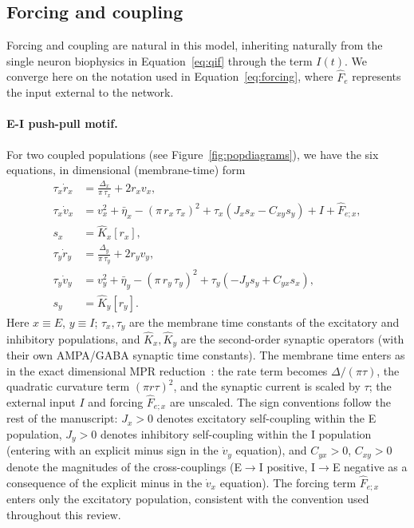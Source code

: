 \documentclass[11pt]{article}
\numberwithin{equation}{section}
\newcommand{\rev}[1]{\begingroup\color{black}#1\endgroup}
\begin{document}
\subsection{Forcing and coupling}
Forcing and coupling are natural in this model, inheriting naturally from the single neuron biophysics in Equation~\ref{eq:qif} through the term $I(t)$. We converge here on the notation used in Equation~\ref{eq:forcing}, where $\hat F_e$ represents the input external to the network.

\paragraph{E-I push-pull motif.}  For two coupled populations (see Figure~\ref{fig:popdiagrams}), we have the six equations, in dimensional (membrane-time) form
\rev{\begin{equation}
\begin{aligned}
\tau_x \dot r_x &= \frac{\Delta_x}{\pi\,\tau_x} + 2 r_x v_x, \\
\tau_x \dot v_x &= v_x^2 + \bar\eta_x - \left(\pi\, r_x\, \tau_x\right)^2
                   + \tau_x\!\left(J_x s_x - C_{xy} s_y\right) + I + \hat F_{e;x}, \\
s_x &= \hat K_x[r_x], \\
\tau_y \dot r_y &= \frac{\Delta_y}{\pi\,\tau_y} + 2 r_y v_y, \\
\tau_y \dot v_y &= v_y^2 + \bar\eta_y - \left(\pi\, r_y\, \tau_y\right)^2
                   + \tau_y\!\left(-J_y s_y + C_{yx} s_x\right), \\
s_y &= \hat K_y[r_y].
\end{aligned}
\label{eq:nmm2-EI-pushpull}
\end{equation}
Here $x\equiv E$, $y\equiv I$; $\tau_x,\tau_y$ are the membrane time constants of the
excitatory and inhibitory populations, and $\hat K_x,\hat K_y$ are the second-order
synaptic operators (with their own AMPA/GABA synaptic time constants). The membrane
time enters as in the exact dimensional MPR reduction~\cite{Montbrio:2015aa,clusellaComparisonExactHeuristic2023}:
the rate term becomes $\Delta/(\pi\tau)$, the quadratic curvature term $(\pi r\tau)^2$,
and the synaptic current is scaled by $\tau$; the external input $I$ and forcing
$\hat F_{e;x}$ are unscaled.
The sign conventions follow the rest of the manuscript: $J_x>0$ denotes excitatory self-coupling within the E population, $J_y>0$ denotes inhibitory self-coupling within the I population (entering with an explicit minus sign in the $\dot v_y$ equation), and $C_{yx}>0$, $C_{xy}>0$ denote the magnitudes of the cross-couplings (E$\to$I positive, I$\to$E negative as a consequence of the explicit minus in the $\dot v_x$ equation). The forcing term $\hat F_{e;x}$ enters only the excitatory population, consistent with the convention used throughout this review.}
\end{document}
